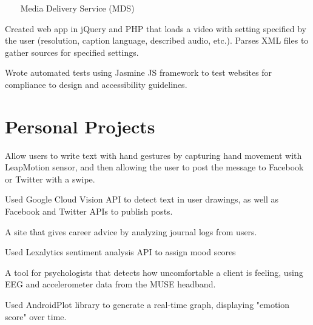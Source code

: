 \documentclass[]{deedy-resume-openfont}
\begin{document}
\begin{minipage}[t]{0.66\textwidth}
~~~ Media Delivery Service (MDS)
\begin{tightemize}
\item Created web app in jQuery and PHP that loads a video with setting specified by the user (resolution, caption language, described audio, etc.). Parses XML files to gather sources for specified settings.
\item Wrote automated tests using Jasmine JS framework to test websites for compliance to design and accessibility guidelines.
\end{tightemize}
\sectionsep


\section{Personal Projects}
\begin{tightemize}
\item Allow users to write text with hand gestures by capturing hand movement with LeapMotion sensor, and then allowing the user to post the message to Facebook or Twitter with a swipe. 
\item Used Google Cloud Vision API to detect text in user drawings, as well as Facebook and Twitter APIs to publish posts.
\end{tightemize}
\sectionsep

\begin{tightemize}
\item A site that gives career advice by analyzing journal logs from users.
\item Used Lexalytics sentiment analysis API to assign mood scores 
\end{tightemize}
\sectionsep

\begin{tightemize}
\item A tool for psychologists that detects how uncomfortable a client is feeling, using EEG and accelerometer data from the MUSE headband.
\item Used AndroidPlot library to generate a real-time graph, displaying "emotion score" over time. 
\end{tightemize}
\sectionsep


\end{minipage} 
\end{document}
